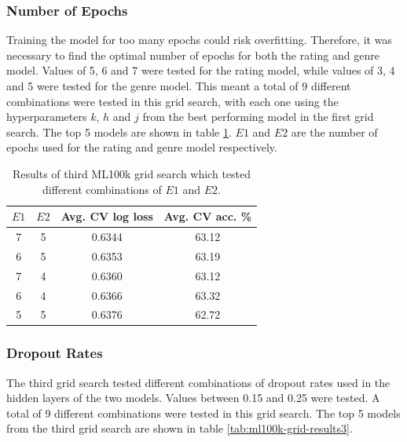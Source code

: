\subsubsection{Number of Epochs}
Training the model for too many epochs could risk overfitting. Therefore, it was necessary to find the optimal number of epochs for both the rating and genre model. Values of 5, 6 and 7 were tested for the rating model, while values of 3, 4 and 5 were tested for the genre model. This meant a total of 9 different combinations were tested in this grid search, with each one using the hyperparameters $k$, $h$ and $j$ from the best performing model in the first grid search. The top 5 models are shown in table \ref{tab:ml100k-grid-results2}. $E1$ and $E2$ are the number of epochs used for the rating and genre model respectively.

\begin{table}[H]
\centering
\begin{tabular}{c | c | c | c}
\toprule
\textbf{$E1$} & \textbf{$E2$} & \textbf{Avg. CV log loss} & \textbf{Avg. CV acc.} \% \\
\midrule
7 & 5 & 0.6344 & 63.12 \\
\midrule
6 & 5 & 0.6353 & 63.19 \\
\midrule
7 & 4 & 0.6360 & 63.12 \\
\midrule
6 & 4 & 0.6366 & 63.32 \\
\midrule
5 & 5 & 0.6376 & 62.72 \\
\bottomrule
\end{tabular}
\caption[MovieLens 100k grid search results -- number of epochs]{Results of third ML100k grid search which tested  different combinations of $E1$ and $E2$.}
\label{tab:ml100k-grid-results2}
\end{table}

\subsubsection{Dropout Rates}
The third grid search tested different combinations of dropout rates used in the hidden layers of the two models. Values between 0.15 and 0.25 were tested. A total of 9 different combinations were tested in this grid search. The top 5 models from the third grid search are shown in table \ref{tab:ml100k-grid-results3}.

